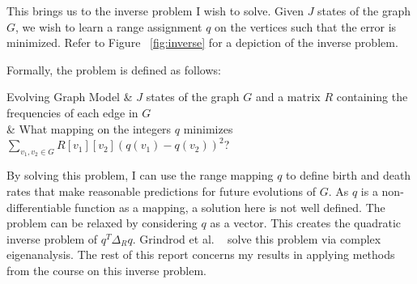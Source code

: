 This brings us to the inverse problem I wish to solve.
Given $J$ states of the graph $G$, we wish to learn a range assignment $q$ on the vertices such that the error is minimized.
Refer to Figure ~\ref{fig:inverse} for a depiction of the inverse problem.

Formally, the problem is defined as follows:

\begin{problem}{Evolving Graph Model}
	\Input & $J$ states of the graph $G$ and a matrix $R$ containing the frequencies of each edge in $G$\\
	\Prob & What mapping on the integers $q$ minimizes $\sum_{v_1,v_2 \in G}R[v_1][v_2](q(v_1) - q(v_2))^2$?
\end{problem}

By solving this problem, I can use the range mapping $q$ to define birth and death rates that make reasonable predictions for
future evolutions of $G$.
As $q$ is a non-differentiable function as a mapping, a solution here is not well defined.
The problem can be relaxed by considering $q$ as a vector.
This creates the quadratic inverse problem of $q^T \Delta_R q$.
Grindrod et al. ~\cite{grindrod2009} solve this problem via complex eigenanalysis.
The rest of this report concerns my results in applying methods from the course on this inverse problem.